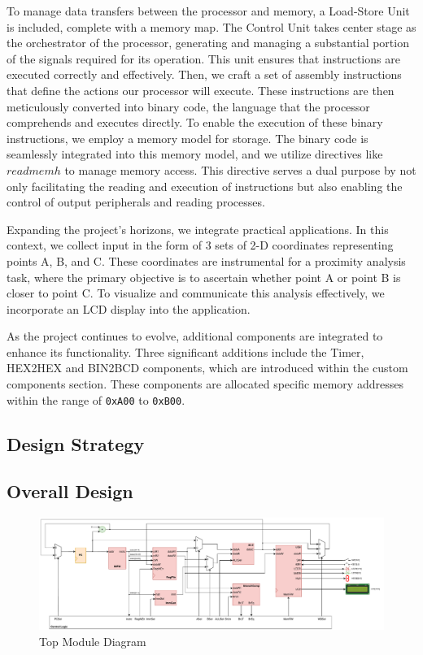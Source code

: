 \documentclass[12pt,a4paper,oneside]{book} %
\begin{document}
To manage data transfers between the processor and memory, a Load-Store Unit is included, complete with a memory map. The Control Unit takes center stage as the orchestrator of the processor, generating and managing a substantial portion of the signals required for its operation. This unit ensures that instructions are executed correctly and effectively. Then, we craft a set of assembly instructions that define the actions our processor will execute. These instructions are then meticulously converted into binary code, the language that the processor comprehends and executes directly. To enable the execution of these binary instructions, we employ a memory model for storage. The binary code is seamlessly integrated into this memory model, and we utilize directives like $readmemh$ to manage memory access. This directive serves a dual purpose by not only facilitating the reading and execution of instructions but also enabling the control of output peripherals and reading processes.

Expanding the project's horizons, we integrate practical applications. In this context, we collect input in the form of 3 sets of 2-D coordinates representing points A, B, and C. These coordinates are instrumental for a proximity analysis task, where the primary objective is to ascertain whether point A or point B is closer to point C. To visualize and communicate this analysis effectively, we incorporate an LCD display into the application.

As the project continues to evolve, additional components are integrated to enhance its functionality. Three significant additions include the Timer, HEX2HEX and BIN2BCD components, which are introduced within the custom components section. These components are allocated specific memory addresses within the range of \texttt{0xA00} to \texttt{0xB00}.

\begin{landscape}
\chapter{Design Strategy}
\section{Overall Design}
\begin{figure}[H]
    \centering
    \includegraphics[scale=.6]{images/top_diagram.pdf}
    \caption{Top Module Diagram}
\end{figure}
\end{landscape}
\end{document}
